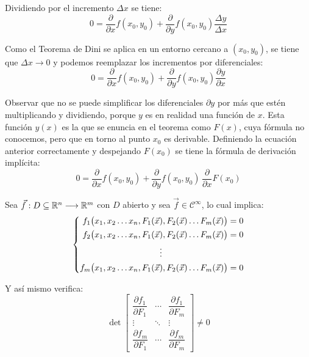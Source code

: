 Dividiendo por el incremento $\Delta x$ se tiene:
\begin{equation*}
    0 = \dfrac{\partial}{\partial x} f(x_0,y_0)+ \dfrac{\partial}{\partial y} f(x_0,y_0) \dfrac{\Delta y}{\Delta x}
\end{equation*}

Como el Teorema de Dini se aplica en un entorno cercano a $(x_0,y_0)$, se tiene que $\Delta x \to 0$ y podemos reemplazar los incrementos por diferenciales:
\begin{equation*}
    0 = \dfrac{\partial}{\partial x} f(x_0,y_0)+ \dfrac{\partial}{\partial y} f(x_0,y_0) \dfrac{\partial y}{\partial x}
\end{equation*}

Observar que no se puede simplificar los diferenciales $\partial y$ por más que estén multiplicando y dividiendo, porque $y$ es en realidad una función de $x$.
Esta función $y(x)$ es la que se enuncia en el teorema como $F(x)$, cuya fórmula no conocemos, pero que en torno al punto $x_0$ es derivable.
Definiendo la ecuación anterior correctamente y despejando $F(x_0)$ se tiene la fórmula de derivación implícita:
\begin{equation*}
    0 = \frac{\partial}{\partial x} f(x_0,y_0)+ \frac{\partial}{\partial y} f(x_0,y_0) \, \frac{\partial}{\partial x} F(x_0)
\end{equation*}


Sea $\Vec{f}:D \subseteq \mathbb{R}^n \longrightarrow \mathbb{R}^m$ con $D$ abierto y sea $\Vec{f} \in \mathcal{C}^\infty$, lo cual implica:
\begin{equation*}
    \left\{
    \begin{aligned}
        f_1 \big( x_1,x_2 \dots x_n, F_1(\Vec{x}), F_2(\Vec{x}) \dots F_m(\Vec{x}) \big) &= 0
        \\
        f_2 \big( x_1,x_2 \dots x_n, F_1(\Vec{x}), F_2(\Vec{x}) \dots F_m(\Vec{x}) \big) &= 0
        \\
        \vdots \hspace{2.7cm} &
        \\
        f_m \big( x_1,x_2 \dots x_n, F_1(\Vec{x}), F_2(\Vec{x}) \dots F_m(\Vec{x}) \big) &= 0
    \end{aligned}
    \right.
\end{equation*}

Y así mismo verifica:
\begin{equation*}
    \operatorname{det}
    \begin{bmatrix}
        \dfrac{\partial f_1}{\partial F_1} & \cdots & \dfrac{\partial f_1}{\partial F_m}
        \\
        \vdots & \ddots & \vdots
        \\
        \dfrac{\partial f_m}{\partial F_1} & \cdots & \dfrac{\partial f_m}{\partial F_m}
    \end{bmatrix}
    \neq 0
\end{equation*}


